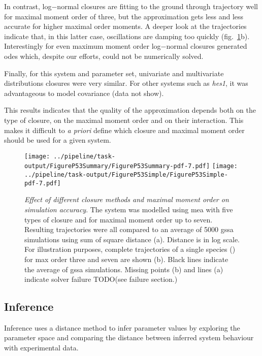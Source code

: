 In contrast, log$-$normal closures are fitting to the ground through trajectory well for maximal moment order of three,
but the approximation gets less and less accurate for higher maximal order moments.
A deeper look at the trajectories indicate that, in this latter case,
oscillations are damping too quickly (fig.~\ref{fig:max_order_and_closure_on_distance}b).
Interestingly for even maximum moment order log$-$normal closures generated \gls{ode}s which,
despite our efforts, could not be numerically solved.

Finally, for this system and parameter set, univariate and multivariate distributions closures were very similar.
For other systems such as \emph{hes1}, it was advantageous to model covariance (data not show).

This results indicates that the quality of the approximation depends both on the type of closure, on the maximal moment order and on their interaction. This makes it difficult to \emph{a priori} define which closure and maximal moment order should be used for a given system.

\begin{figure}

\texttt{[image: ../pipeline/task-output/FigureP53Summary/FigureP53Summary-pdf-7.pdf]}
\texttt{[image: ../pipeline/task-output/FigureP53Simple/FigureP53Simple-pdf-7.pdf]}
\caption{\emph{Effect of different closure methods and maximal moment order on simulation accuracy}.
The \pft system was modelled using \gls{mea} with five types of closure and for maximal moment order up to seven.
Resulting trajectories were all compared to an average of 5000 \gls{gssa} simulations using sum of square distance (a).
Distance is in log scale.
For illustration purposes, complete trajectories of a single species (\pft) for max order three and seven are shown (b).
Black lines indicate the average of \gls{gssa} simulations. Missing points (b) and lines (a) indicate solver failure
TODO(see failure section.)}

\label{fig:max_order_and_closure_on_distance}
\end{figure}

\subsection{Inference}
Inference uses a distance method to infer parameter values by exploring the parameter space and comparing the distance between inferred system behaviour with experimental data. 

